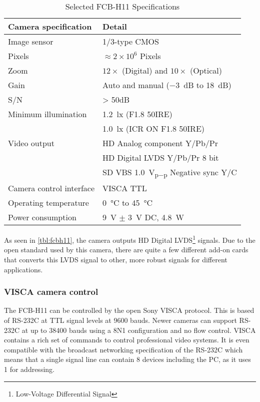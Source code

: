 \begin{table}[htbp]
	\centering
	\begin{tabular}{ll}
	
		\toprule
			Camera specification 	& Detail \\
		\midrule
			Image sensor 			& 1/3-type CMOS \\
			Pixels 					& $\approx 2 \times 10^{6}$ Pixels \\
			Zoom 					& $12\times$ (Digital) and $10\times$ (Optical) \\
			Gain 					& Auto and manual (\SI{-3}{\deci\bel} to \SI{18}{\deci\bel}) \\
			S/N						& > 50dB \\
			Minimum illumination 	& \SI{1.2}{\lux} (F1.8 50IRE) \\
									& \SI{1.0}{\lux} (ICR ON F1.8 50IRE) \\
			Video output			& HD Analog component Y/Pb/Pr \\
									& HD Digital LVDS Y/Pb/Pr 8 bit \\
									& SD VBS \SI{1.0}{\volt_{p-p}} Negative sync Y/C \\
			Camera control interface& VISCA TTL \\
			Operating temperature	& \SI{0}{\celsius} to \SI{45}{\celsius} \\
			Power consumption		& \SI{9}{\volt} $\pm$ \SI{3}{\volt} DC, \SI{4.8}{\watt} \\
		\bottomrule
	\end{tabular}
	\caption{Selected FCB-H11 Specifications}
	\label{tbl:fcbh11}
\end{table}


As seen in \vref{tbl:fcbh11}, the camera outputs HD Digital LVDS\footnote{Low-Voltage Differential Signal} signals.
Due to the open standard used by this camera, there are quite a few different add-on cards that 
converts this LVDS signal to other, more robust signals for different applications.

\subsubsection{VISCA camera control}\label{sec:visca}
The FCB-H11 can be controlled by the open Sony VISCA protocol. This is based of RS-232C at TTL signal levels
at 9600 bauds. Newer cameras can support RS-232C at up to 38400 bauds using a 8N1 configuration and no flow control. 
VISCA contains a rich set of commands to control professional video systems. It is even compatible with 
the broadcast networking specification of the RS-232C which means that a single signal line can contain 
8 devices including the PC, as it uses \SI{1}{\byte} for addressing.

